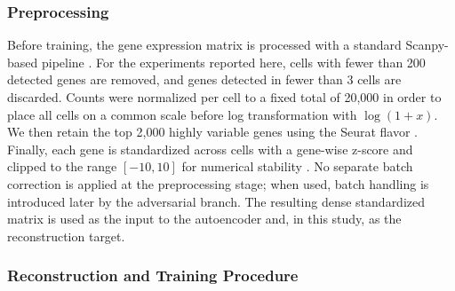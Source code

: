 \documentclass[11pt,a4paper]{article}
\begin{document}
\subsubsection*{Preprocessing}

Before training, the gene expression matrix is processed with a standard
Scanpy-based pipeline \cite{wolf2018,luecken2019}. For the experiments reported here, cells with
fewer than 200 detected genes are removed, and genes detected in fewer
than 3 cells are discarded. Counts were normalized per cell to a fixed total of 20,000 in order to place all cells on a common scale before log transformation
with $\log(1+x)$. We then retain the top 2,000 highly variable genes
using the Seurat flavor \cite{satija2015}. Finally, each gene is standardized across
cells with a gene-wise z-score and clipped to the range $[-10, 10]$ for
numerical stability \cite{luecken2019}. No separate batch correction is applied at the
preprocessing stage; when used, batch handling is introduced later by
the adversarial branch. The resulting dense standardized matrix is used
as the input to the autoencoder and, in this study, as the
reconstruction target.

\subsubsection*{Reconstruction and Training Procedure}
\end{document}
